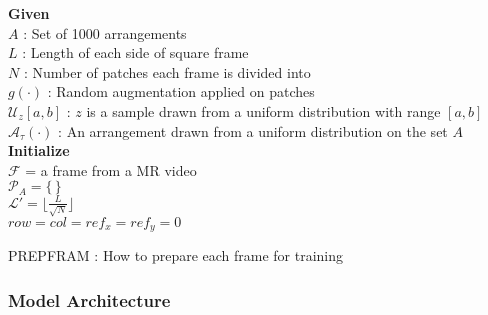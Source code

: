 \documentclass[journal]{IEEEtai}
\begin{document}
\begin{algorithm}
\SetAlgoLined
{}
 \textbf{Given}\\
 $A$ : Set of 1000 arrangements\\
 $L$  : Length of each side of square frame\\
 $N$ : Number of patches each frame is divided into\\
 $g(\cdot)$ : Random augmentation applied on patches\\
 $\mathcal{U}_z [a,b]$ : $z$ is a sample drawn from a uniform distribution with range $[a,b]$\\
 $\mathcal{A}_{\tau}(\cdot)$ : An arrangement drawn from a uniform distribution on the set $A$\\
 \textbf{Initialize} \\
 $\mathcal{F}$ = a frame from a MR video\\
 $\mathcal{P}_A = \{\,\}$\\
 $\mathcal{L'} = \lfloor \frac{L}{\sqrt{N}} \rfloor$\\
 $row = col = ref_{x} = ref_{y} = 0$\\
 \caption{PREPFRAM : How to prepare each frame for training}
 \label{alg:alg1}
\end{algorithm}

\subsubsection{Model Architecture}
\label{subsubsec:pretext_model_arch}
\end{document}
